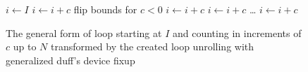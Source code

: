 \begin{figure}[H]
    \centering
    \begin{algorithmic}
        \State $i \gets I$
                \State {} 
                \State $i \gets i + c$ 
            \EndWhile
        \EndIf
             \Comment flip bounds for $c < 0$
                \State {}
                \State $i \gets i + c$
            \EndCase
                \State {}
                \State $i \gets i + c$
            \EndCase
            \State
            \ldots
                \State {}
                \State $i \gets i + c$
            \EndCase
        \EndSwitch
        \EndFunction
    \end{algorithmic}
    \caption{The general form of loop starting at $I$ and counting in increments of $c$ up to $N$ transformed by the created loop unrolling with generalized duff's device fixup}
    \label{fig:impl:fixup:duff:general-loop}
\end{figure}